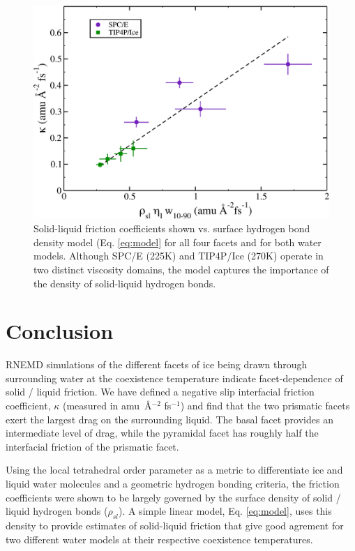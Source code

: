 \begin{figure}
\includegraphics[width=\linewidth]{Figures/simpleModel}
\caption{\label{fig:simpleModel} Solid-liquid friction coefficients
  shown vs. surface hydrogen bond density model (Eq. \eqref{eq:model}
  for all four facets and for both water models.  Although SPC/E
  (225K) and TIP4P/Ice (270K) operate in two distinct viscosity
  domains, the model captures the importance of the density of
  solid-liquid hydrogen bonds.}
\end{figure}                                            

\section{Conclusion}
RNEMD simulations of the different facets of ice being drawn through
surrounding water at the coexistence temperature indicate
facet-dependence of solid / liquid friction.  We have defined a
negative slip interfacial friction coefficient, $\kappa$ (measured in
amu~\AA$^{-2}$ fs$^{-1}$) and find that the two prismatic facets exert
the largest drag on the surrounding liquid.  The basal facet provides
an intermediate level of drag, while the pyramidal facet has roughly
half the interfacial friction of the prismatic facet.

Using the local tetrahedral order parameter as a metric to
differentiate ice and liquid water molecules and a geometric hydrogen
bonding criteria, the friction coefficients were shown to be largely
governed by the surface density of solid / liquid hydrogen bonds
($\rho_{sl}$).  A simple linear model, Eq. \eqref{eq:model}, uses
this density to provide estimates of solid-liquid friction that give
good agrement for two different water models at their respective
coexistence temperatures.

